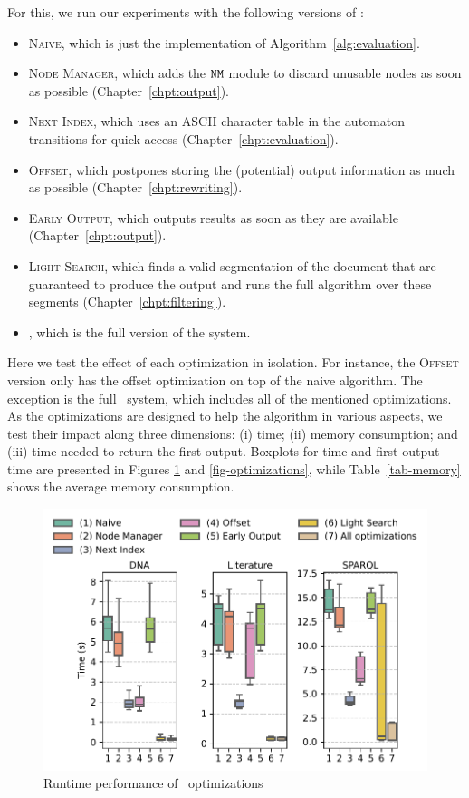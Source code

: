 For this, we run our experiments with the following versions of \rematch:
\begin{itemize}
	\item \textsc{Naive}, which is just the implementation of
	Algorithm~\ref{alg:evaluation}.
	\item \textsc{Node Manager}, which adds the $\mathtt{NM}$ module to discard unusable
	nodes as soon as possible (Chapter~\ref{chpt:output}).
	\item \textsc{Next Index}, which uses an ASCII character table in the
	automaton transitions for quick access (Chapter~\ref{chpt:evaluation}).
	\item \textsc{Offset}, which postpones storing the (potential) output
	information as much as possible (Chapter~\ref{chpt:rewriting}).
	\item \textsc{Early Output}, which outputs results as soon as they are
	available (Chapter~\ref{chpt:output}).
	\item \textsc{Light Search}, which finds a valid segmentation of the
	document that are guaranteed to produce the output and runs the full
	algorithm over these segments (Chapter~\ref{chpt:filtering}).
	\item \rematch, which is the full version of the system.
\end{itemize}

Here we test the effect of each optimization in isolation. For instance, the
\textsc{Offset} version only has the offset optimization on top of the naive
algorithm. The exception is the full \rematch\ system, which includes all of the
mentioned optimizations. As the optimizations are designed to help the algorithm
in various aspects, we test their impact along three dimensions: (i) time; (ii)
memory consumption; and (iii) time needed to return the first output. Boxplots
for time and first output time are presented in Figures \ref{fig:opt-time} and
\ref{fig-optimizations}, while Table~\ref{tab-memory} shows the average memory
consumption.


\begin{figure}[t]
	\centering
	\centering
	\includegraphics[width=.8\textwidth]{figures/versions-time.pdf}
	\caption{Runtime performance of \rematch\ optimizations}
	\label{fig:opt-time}
\end{figure}

